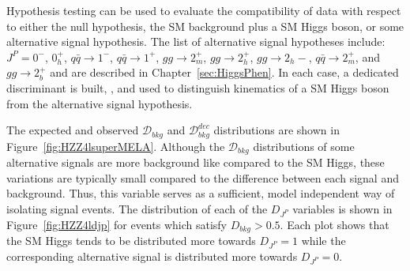 Hypothesis testing can be used to evaluate the compatibility 
of data with respect to either the null hypothesis, the SM
background plus a SM Higgs boson, or some alternative signal
hypothesis.  The list of alternative signal hypotheses include:
$J^P=0^-$, $0^+_h$, $q\bar{q}\to1^-$, $q\bar{q}\to1^+$, 
$gg\to2_m^+$, $gg\to2_h^+$, $gg\to2_h-$, $q\bar{q}\to2_m^+$, 
and $gg\to2_b^+$ and are described in Chapter~\ref{sec:HiggsPhen}.  
In each case, a dedicated discriminant is built, 
\spinKD, and used to distinguish kinematics of a SM Higgs boson 
from the alternative signal hypothesis.  


The expected and observed $\mathscr{D}_{bkg}$ and 
$\mathscr{D}_{bkg}^{dec}$ distributions are shown in 
Figure~\ref{fig:HZZ4lsuperMELA}.  
Although the $\mathscr{D}_{bkg}$ distributions of some 
alternative signals are more background 
like compared to the SM Higgs, these variations are typically 
small compared to the difference between each signal and 
background.  Thus, this variable serves as a sufficient, model 
independent way of isolating signal events.  
The distribution of each of the $D_{J^P}$ variables is shown in 
Figure~\ref{fig:HZZ4ldjp} for events which satisfy
$D_{bkg}>0.5$.  Each plot shows that the SM 
Higgs tends
to be distributed more towards $D_{J^P}=1$ while the corresponding
alternative signal is distributed more towards $D_{J^P}=0$. 

